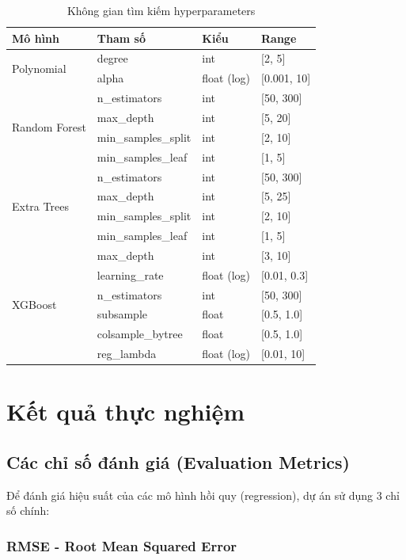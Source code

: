 \documentclass[12pt,a4paper]{article}
\begin{document}
\begin{table}[H]
\centering
\caption{Không gian tìm kiếm hyperparameters}
\label{tab:search_space}
\begin{tabular}{|l|l|l|l|}
\hline
\textbf{Mô hình} & \textbf{Tham số} & \textbf{Kiểu} & \textbf{Range} \\
\hline
\multirow{2}{*}{Polynomial} & degree & int & [2, 5] \\
& alpha & float (log) & [0.001, 10] \\
\hline
\multirow{4}{*}{Random Forest} & n\_estimators & int & [50, 300] \\
& max\_depth & int & [5, 20] \\
& min\_samples\_split & int & [2, 10] \\
& min\_samples\_leaf & int & [1, 5] \\
\hline
\multirow{4}{*}{Extra Trees} & n\_estimators & int & [50, 300] \\
& max\_depth & int & [5, 25] \\
& min\_samples\_split & int & [2, 10] \\
& min\_samples\_leaf & int & [1, 5] \\
\hline
\multirow{6}{*}{XGBoost} & max\_depth & int & [3, 10] \\
& learning\_rate & float (log) & [0.01, 0.3] \\
& n\_estimators & int & [50, 300] \\
& subsample & float & [0.5, 1.0] \\
& colsample\_bytree & float & [0.5, 1.0] \\
& reg\_lambda & float (log) & [0.01, 10] \\
\hline
\end{tabular}
\end{table}

\section{Kết quả thực nghiệm}

\subsection{Các chỉ số đánh giá (Evaluation Metrics)}

Để đánh giá hiệu suất của các mô hình hồi quy (regression), dự án sử dụng 3 chỉ số chính:

\subsubsection{RMSE - Root Mean Squared Error}
\end{document}
